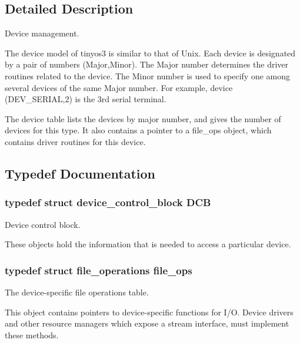 \subsection{Detailed Description}
Device management. 

The device model of tinyos3 is similar to that of Unix. Each device is designated by a pair of numbers (Major,Minor). The Major number determines the driver routines related to the device. The Minor number is used to specify one among several devices of the same Major number. For example, device (D\+E\+V\+\_\+\+S\+E\+R\+I\+AL,2) is the 3rd serial terminal.

The device table lists the devices by major number, and gives the number of devices for this type. It also contains a pointer to a file\+\_\+ops object, which contains driver routines for this device. 

\subsection{Typedef Documentation}
\subsubsection[{\texorpdfstring{D\+CB}{DCB}}]{\setlength{\rightskip}{0pt plus 5cm}typedef struct {\bf device\+\_\+control\+\_\+block}  {\bf D\+CB}}\hypertarget{group__dev_gaf0e2d4a982667466d84f6fb7522611d6}{}\label{group__dev_gaf0e2d4a982667466d84f6fb7522611d6}


Device control block. 

These objects hold the information that is needed to access a particular device. 
\subsubsection[{\texorpdfstring{file\+\_\+ops}{file_ops}}]{\setlength{\rightskip}{0pt plus 5cm}typedef struct {\bf file\+\_\+operations}  {\bf file\+\_\+ops}}\hypertarget{group__dev_gaab625d8ae3a95e942ed10ed1579f5042}{}\label{group__dev_gaab625d8ae3a95e942ed10ed1579f5042}


The device-\/specific file operations table. 

This object contains pointers to device-\/specific functions for I/O. Device drivers and other resource managers which expose a stream interface, must implement these methods.

